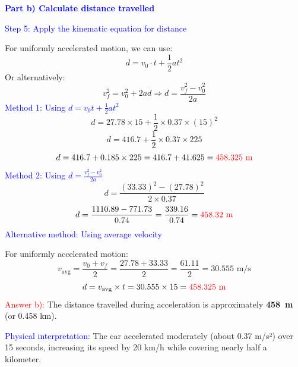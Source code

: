 \begin{exercise}
\begin{solu}
        \vspace{0.5cm}

        \textbf{\textcolor{blue}{Part b) Calculate distance travelled}}

        \textcolor{blue}{Step 5: Apply the kinematic equation for distance}

        For uniformly accelerated motion, we can use:
        \[
            \boxed{d = v_0 \cdot t + \frac{1}{2} a t^2}
        \]
        Or alternatively:
        \[
            \boxed{v_f^2 = v_0^2 + 2ad} \Rightarrow d = \frac{v_f^2 - v_0^2}{2a}
        \]
        \textcolor{blue}{Method 1: Using $d = v_0 t + \frac{1}{2}at^2$}
        \[
            d = 27.78 \times 15 + \frac{1}{2} \times 0.37 \times (15)^2
        \]
        \[
            d = 416.7 + \frac{1}{2} \times 0.37 \times 225
        \]
        \[
            d = 416.7 + 0.185 \times 225 = 416.7 + 41.625 = \textcolor{red}{458.325 \text{ m}}
        \]
        \textcolor{blue}{Method 2: Using $d = \frac{v_f^2 - v_0^2}{2a}$}
        \[
            d = \frac{(33.33)^2 - (27.78)^2}{2 \times 0.37}
        \]
        \[
            d = \frac{1110.89 - 771.73}{0.74} = \frac{339.16}{0.74} = \textcolor{red}{458.32 \text{ m}}
        \]
        \textcolor{blue}{Alternative method: Using average velocity}

        For uniformly accelerated motion:
        \[
            v_{\text{avg}} = \frac{v_0 + v_f}{2} = \frac{27.78 + 33.33}{2} = \frac{61.11}{2} = 30.555 \text{ m/s}
        \]
        \[
            d = v_{\text{avg}} \times t = 30.555 \times 15 = \textcolor{red}{458.325 \text{ m}}
        \]
        \textcolor{red}{Answer b):} The distance travelled during acceleration is approximately \textbf{\qty{458}{\m}} (or 0.458 km).

        \textcolor{blue}{Physical interpretation:} The car accelerated moderately (about 0.37 m/s²) over 15 seconds, increasing its speed by 20 km/h while covering nearly half a kilometer.
    \end{solu}
\end{exercise}


